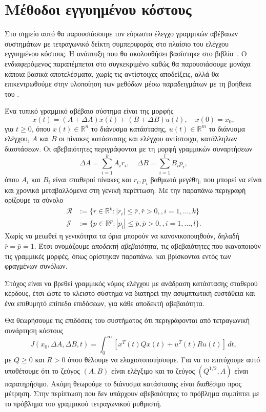 \chapter{Μέθοδοι  εγγυημένου κόστους}\label{ch:gcc}
Στο σημείο αυτό θα παρουσιάσουμε τον εύρωστο έλεγχο γραμμικών αβέβαιων
συστημάτων με τετραγωνικό δείκτη συμπεριφοράς στο πλαίσιο του ελέγχου εγγυημένου
κόστους. Η ανάπτυξη που θα ακολουθήσει βασίστηκε στο
βιβλίο~\cite{kosmidou2009robust}. Ο ενδιαφερόμενος παραπέμπεται στο
συγκεκριμένο καθώς θα παρουσιάσουμε μονάχα κάποια βασικά αποτελέσματα, χωρίς τις
αντίστοιχες αποδείξεις, αλλά θα επικεντρωθούμε στην υλοποίηση των μεθόδων μέσω
παραδειγμάτων με τη βοήθεια του .

Ένα τυπικό γραμμικό αβέβαιο σύστημα είναι της μορφής
\begin{equation}\label{eq:un_ss}
    \dot{x}(t) = (A + \Delta A)x(t) + (B + \Delta B) u(t), \quad x(0) = x_0,
\end{equation}
για \( t \geq 0 \), όπου \( x(t) \in \mathbb{R}^n \) το διάνυσμα κατάστασης,
\( u(t) \in \mathbb{R}^m \) το διάνυσμα ελέγχου, \( A \) και \( B \) οι πίνακες
κατάστασης και ελέγχου αντίστοιχα, κατάλληλων διαστάσεων. Οι αβεβαιότητες περιγράφονται
με τη μορφή γραμμικών συναρτήσεων
\[
    \Delta A = \sum_{i = 1}^{k} A_i r_i, \quad
    \Delta B = \sum_{i = 1}^{l} B_i p_i,
\]
όπου \( A_i \) και \( B_i \) είναι σταθεροί πίνακες και \( r_i, p_i \) βαθμωτά
μεγέθη, που μπορεί να είναι και χρονικά μεταβαλλόμενα στη γενική περίπτωση. Με
την παραπάνω περιγραφή ορίζουμε τα σύνολο
\begin{align*}
    \mathcal{R} &:= \{ r \in \mathbb{R}^k: |r_i| \leq \bar{r}, \bar{r} > 0, ,i = 1, \dots,
    k \} \\
    \mathcal{J} &:= \{ p \in \mathbb{R}^p: |p_i| \leq \bar{p}, \bar{p} > 0, ,i = 1, \dots,
    l \}.
\end{align*}
Χωρίς να μειωθεί η γενικότητα τα όρια μπορούν να κανονικοποιηθούν, δηλαδή \(
\bar{r} = \bar{p} = 1 \). Έτσι ονομάζουμε \emph{αποδεκτή αβεβαιότητα}, τις
αβεβαιότητες που ικανοποιούν τις γραμμικές μορφές, όπως ορίστηκαν παραπάνω, και
βρίσκονται εντός των φραγμένων συνόλων.

Στόχος είναι να βρεθεί γραμμικός νόμος ελέγχου με ανάδραση κατάστασης σταθερού
κέρδους, έτσι ώστε το κλειστό σύστημα να διατηρεί την ασυμπτωτική ευστάθεια και
ένα επιθυμητό επίπεδο επιδόσεων, για κάθε αποδεκτή αβεβαιότητα.

Θα θεωρήσουμε τις επιδόσεις του συστήματος ότι περιγράφονται από τετραγωνική
συνάρτηση κόστους
\begin{equation}\label{eq:un_cost}
    J(x_0, \Delta A, \Delta B, t) = \int_0^{\infty}
    \left[ x^T(t)Qx(t) + u^T(t)Ru(t) \right] \, dt,
\end{equation}
με \( Q \geq 0 \) και \( R > 0 \) όπου θέλουμε να ελαχιστοποιήσουμε. Για να το
επιτύχουμε αυτό υποθέτουμε ότι το ζεύγος \( (A, B) \) είναι ελέγξιμο και το
ζεύγος \( (Q^{1/2}, A) \) είναι παρατηρήσιμο. Ακόμη θεωρούμε το διάνυσμα
κατάστασης είναι διαθέσιμο προς μέτρηση. Στην περίπτωση που δεν υπάρχουν
αβεβαιότητες το πρόβλημα συμπίπτει με το πρόβλημα του γραμμικού τετραγωνικού ρυθμιστή.

